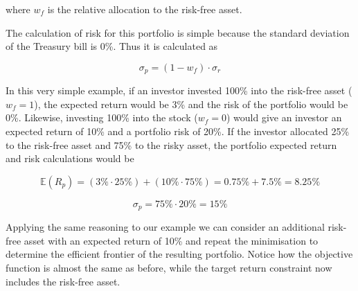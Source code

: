 where \(w_f\) is the relative allocation to the risk-free asset.

The calculation of risk for this portfolio is simple because the
standard deviation of the Treasury bill is 0\%. Thus it is calculated
as

\[ \sigma_p = (1-w_f)\cdot \sigma_r \]

In this very simple example, if an investor invested 100\% into
the risk-free asset (\(w_f=1\)), the expected return would be 3\% and
the risk of the portfolio would be 0\%. Likewise, investing 100\% into
the stock (\(w_f=0\)) would give an investor an expected return of 10\%
and a portfolio risk of 20\%. If the investor allocated 25\% to the
risk-free asset and 75\% to the risky asset, the portfolio expected
return and risk calculations would be

\[ \mathbb{E}(R_p) = (3\% \cdot 25\%) + (10\% \cdot 75\%) = 0.75\% + 7.5\% = 8.25\% \]

\[ \sigma_p = 75\% \cdot 20\% = 15\% \]

Applying the same reasoning to our example we can consider an additional
risk-free asset with an expected return of 10\% and repeat the
minimisation to determine the efficient frontier of the resulting
portfolio. Notice how the objective function is almost the same as before, 
while the target return constraint now includes the risk-free asset.

